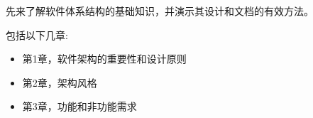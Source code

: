 
先来了解软件体系结构的基础知识，并演示其设计和文档的有效方法。

包括以下几章:

\begin{itemize}
\item 第1章，软件架构的重要性和设计原则
\item 第2章，架构风格
\item 第3章，功能和非功能需求
\end{itemize}